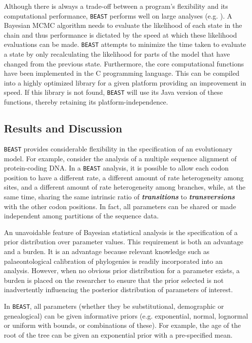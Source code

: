 \documentclass[cup7b, english]{cupbook}
\begin{document}
Although there is always a trade-off between a program's flexibility
and its computational performance, \texttt{BEAST} performs well on large analyses
(e.g. \cite{Shapiroetal2004}). A Bayesian MCMC algorithm needs to
evaluate the likelihood of each state in the chain and thus performance
is dictated by the speed at which these likelihood evaluations can
be made. \texttt{BEAST} attempts to minimize the time taken to evaluate a state
by only recalculating the likelihood for parts of the model that have
changed from the previous state. Furthermore, the core computational
functions have been implemented in the C programming language. This
can be compiled into a highly optimized library for a given platform
providing an improvement in speed. If this library is not found, \texttt{BEAST}
will use its Java version of these functions, thereby retaining its
platform-independence.

\subsection{Results and Discussion}

\texttt{BEAST} provides considerable flexibility in the specification of an
evolutionary model. For example, consider the analysis of a multiple
sequence alignment of protein-coding DNA. In a \texttt{BEAST} analysis, it is possible
to allow each codon position to have a different rate, a different
amount of rate heterogeneity among sites, and a different amount of
rate heterogeneity among branches, while, at the same time, sharing
the same intrinsic ratio of \textbf{\textit{transitions}} to \textbf{\textit{transversions}} with the
other codon positions. In fact, all parameters can be shared or made
independent among partitions of the sequence data.

An unavoidable feature of Bayesian statistical analysis is the specification
of a prior distribution over parameter values. This requirement is
both an advantage and a burden. It is an advantage because relevant
knowledge such as palaeontological calibration of phylogenies is readily
incorporated into an analysis. However, when no obvious prior distribution
for a parameter exists, a burden is placed on the researcher to ensure
that the prior selected is not inadvertently influencing the posterior
distribution of parameters of interest.

In \texttt{BEAST}, all parameters (whether they be substitutional, demographic or genealogical)
can be given informative priors (e.g. exponential, normal, lognormal
or uniform with bounds, or combinations of these). For example, the age of the root of the tree
can be given an exponential prior with a pre-specified mean.
\end{document}

